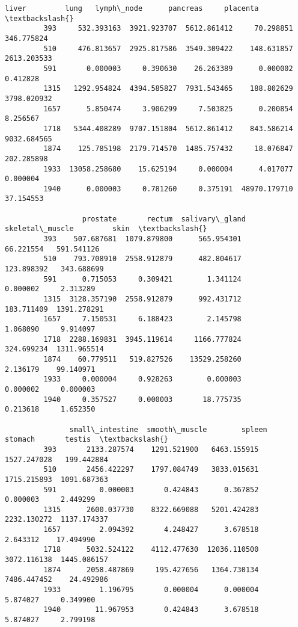 \documentclass[11pt]{article}
\begin{document}
\begin{Verbatim}[commandchars=\\\{\}]
                      liver         lung   lymph\_node      pancreas     placenta  \textbackslash{}
         393     532.393163  3921.923707  5612.861412     70.298851   346.775824   
         510     476.813657  2925.817586  3549.309422    148.631857  2613.203533   
         591       0.000003     0.390630    26.263389      0.000002     0.412828   
         1315   1292.954824  4394.585827  7931.543465    188.802629  3798.020932   
         1657      5.850474     3.906299     7.503825      0.200854     8.256567   
         1718   5344.408289  9707.151804  5612.861412    843.586214  9032.684565   
         1874    125.785198  2179.714570  1485.757432     18.076847   202.285898   
         1933  13058.258680    15.625194     0.000004      4.017077     0.000004   
         1940      0.000003     0.781260     0.375191  48970.179710    37.154553   
         
                  prostate       rectum  salivary\_gland  skeletal\_muscle         skin  \textbackslash{}
         393    507.687681  1079.879800      565.954301        66.221554   591.541126   
         510    793.708910  2558.912879      482.804617       123.898392   343.688699   
         591      0.715053     0.309421        1.341124         0.000002     2.313289   
         1315  3128.357190  2558.912879      992.431712       183.711409  1391.278291   
         1657     7.150531     6.188423        2.145798         1.068090     9.914097   
         1718  2288.169831  3945.119614     1166.777824       324.699234  1311.965514   
         1874    60.779511   519.827526    13529.258260         2.136179    99.140971   
         1933     0.000004     0.928263        0.000003         0.000002     0.000003   
         1940     0.357527     0.000003       18.775735         0.213618     1.652350   
         
               small\_intestine  smooth\_muscle        spleen      stomach       testis  \textbackslash{}
         393       2133.287574    1291.521900   6463.155915  1527.247028   199.442884   
         510       2456.422297    1797.084749   3833.015631  1715.215893  1091.687363   
         591          0.000003       0.424843      0.367852     0.000003     2.449299   
         1315      2600.037730    8322.669088   5201.424283  2232.130272  1137.174337   
         1657         2.094392       4.248427      3.678518     2.643312    17.494990   
         1718      5032.524122    4112.477630  12036.110500  3072.116138  1445.086157   
         1874      2058.487869     195.427656   1364.730134  7486.447452    24.492986   
         1933         1.196795       0.000004      0.000004     5.874027     0.349900   
         1940        11.967953       0.424843      3.678518     5.874027     2.799198   
         

\end{Verbatim}
\end{document}
